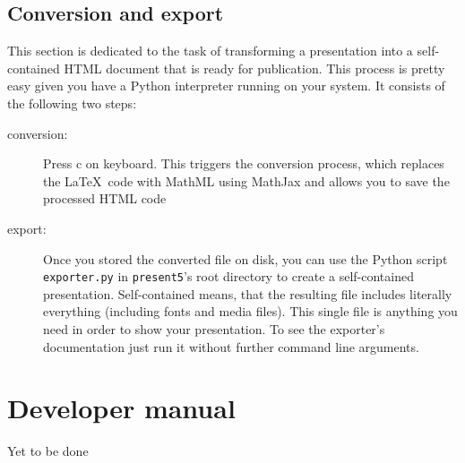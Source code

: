 \documentclass{scrartcl}
\newcommand{\present}{\code{present5}}
\newcommand{\code}[1]{{\tt #1}}
\begin{document}
\subsection{Conversion and export}
\label{subsection:conversion}

This section is dedicated to the task of transforming a presentation into a self-contained HTML document that is ready for publication. This process is pretty easy given you have a Python interpreter running on your system. It consists of the following two steps:
\begin{description}
\item[conversion:] Press c on keyboard. This triggers the conversion process, which replaces the \LaTeX~code with MathML using MathJax and allows you to save the processed HTML code
\item[export:] Once you stored the converted file on disk, you can use the Python script \code{exporter.py} in \present's root directory to create a self-contained presentation. Self-contained means, that the resulting file includes literally everything (including fonts and media files). This single file is anything you need in order to show your presentation. To see the exporter's documentation just run it without further command line arguments.
\end{description}





\section{Developer manual}
\label{section:developerManual} 

Yet to be done


\end{document}
